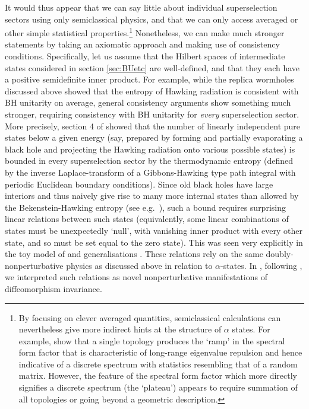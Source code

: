 \documentclass[letterpaper,12pt]{article}
\begin{document}
It would thus appear that we can say little about individual superselection sectors using only semiclassical physics, and that we can only access averaged or other simple statistical properties.\footnote{By focusing on clever averaged quantities, semiclassical calculations can nevertheless give more indirect hints at the structure of $\alpha$ states. For example, \cite{Saad:2018bqo,Saad:2019lba} show that a single topology produces the `ramp' in the spectral form factor that is characteristic of long-range eigenvalue repulsion and hence indicative of a discrete spectrum with statistics resembling that of a random matrix. However, the feature of the spectral form factor which more directly signifies a discrete spectrum (the `plateau') appears to require summation of all topologies or going beyond a geometric description.} Nonetheless, we can make much stronger statements by taking an axiomatic approach and making use of consistency conditions. Specifically, let us assume that the Hilbert spaces of intermediate states considered in section \ref{sec:BUetc} are well-defined, and that they each have a positive semidefinite inner product. For example, while the replica wormholes discussed above showed that the entropy of Hawking radiation is consistent with BH unitarity on average, general consistency arguments show something much stronger, requiring consistency with BH unitarity for \emph{every} superselection sector. More precisely, section 4 of \cite{Marolf:2020xie} showed that the number of linearly independent pure states below a given energy (say, prepared by forming and partially evaporating a black hole and projecting the Hawking radiation onto various possible states) is bounded in every superselection sector by the thermodynamic entropy (defined by the inverse Laplace-transform of a Gibbons-Hawking type path integral \cite{Gibbons:1976ue} with periodic Euclidean boundary conditions).
Since old black holes have large interiors and thus naively give rise to many more internal states than allowed by the Bekenstein-Hawking entropy (see e.g.\ \cite{Rovelli:2017mzl}), such a bound requires surprising linear relations between such states (equivalently, some linear combinations of states must be unexpectedly `null', with vanishing inner product with every other state, and so must be set equal to the zero state). This was seen very explicitly in the toy model of \cite{Marolf:2020xie} and generalisations \cite{Balasubramanian:2020jhl}. These relations rely on the same doubly-nonperturbative physics as discussed above in relation to $\alpha$-states. In \cite{Marolf:2020xie}, following \cite{Jafferis:2017tiu}, we interpreted such relations as novel nonperturbative manifestations of diffeomorphism invariance.
\end{document}
